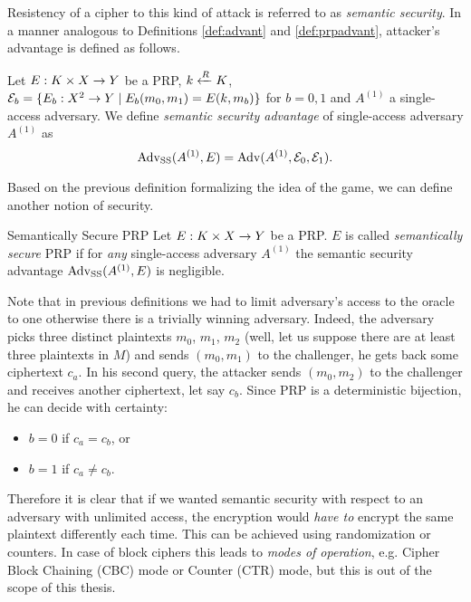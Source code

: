
Resistency of a cipher to this kind of attack is referred to as {\em semantic security}. In a manner analogous to Definitions \ref{def:advant} and \ref{def:prpadvant}, attacker's advantage is defined as follows.

\begin{defn}
\label{def:ssadvant}
	Let $E: K\times X\rightarrow Y$ be a PRP, $k\xleftarrow{R} K$, ${\cal E}_b = \{E_b:X^2\rightarrow Y \mid E_b(m_0,m_1) = E(k,m_b)\}$ for $b=0,1$ and $A^{(1)}$ a single-access adversary. We define {\em semantic security advantage} of single-access adversary $A^{(1)}$ as
	\[
		\operatorname*{Adv_{SS}}(A^{(1)},E) = \operatorname*{Adv}(A^{(1)},{\cal E}_0,{\cal E}_1) .
	\]
\end{defn}

Based on the previous definition formalizing the idea of the game, we can define another notion of security.

\begin{defn}{Semantically Secure PRP}
\label{def:semsecprp}
	Let $E: K\times X\rightarrow Y$ be a PRP. $E$ is called {\em semantically secure} PRP if for {\em any} single-access adversary $A^{(1)}$ the semantic security advantage $\operatorname*{Adv_{SS}}(A^{(1)},E)$ is negligible.
\end{defn}

\begin{note}
	Note that in previous definitions we had to limit adversary's access to the oracle to one otherwise there is a trivially winning adversary. Indeed, the adversary picks three distinct plaintexts $m_0$, $m_1$, $m_2$ (well, let us suppose there are at least three plaintexts in $M$) and sends $(m_0,m_1)$ to the challenger, he gets back some ciphertext $c_a$. In his second query, the attacker sends $(m_0,m_2)$ to the challenger and receives another ciphertext, let say $c_b$. Since PRP is a deterministic bijection, he can decide with certainty:
	\begin{itemize}
		\item $b=0$ if $c_a = c_b$, or
		\item $b=1$ if $c_a \neq c_b$.
	\end{itemize}
	
	Therefore it is clear that if we wanted semantic security with respect to an adversary with unlimited access, the encryption would {\em have to} encrypt the same plaintext differently each time. This can be achieved using randomization or counters. In case of block ciphers this leads to {\em modes of operation}, e.g. Cipher Block Chaining (CBC) mode or Counter (CTR) mode, but this is out of the scope of this thesis.
\end{note}


